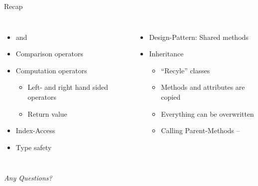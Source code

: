 
\begin{frame}[t,plain]
\titlepage
\end{frame}


\begin{frame}[fragile]{Recap}
%
\begin{columns}[T]
\begin{itemize}
\item {} and 
\item Comparison operators
\item Computation operators
	\begin{itemize}
	\item Left- and right hand sided operators
	\item Return value 
	\end{itemize}
\item Index-Access
\item Type safety
\end{itemize}
%
\begin{itemize}
\item Design-Pattern: Shared methods
\item Inheritance
	\begin{itemize}
	\item \enquote{Recyle} classes
	\item Methods and attributes are copied
	\item Everything can be overwritten
	\item Calling Parent-Methods -- 
	\end{itemize}
\end{itemize}

\end{columns}
%
\begin{center}
	\emph{Any Questions?}
\end{center}
%
\end{frame}


